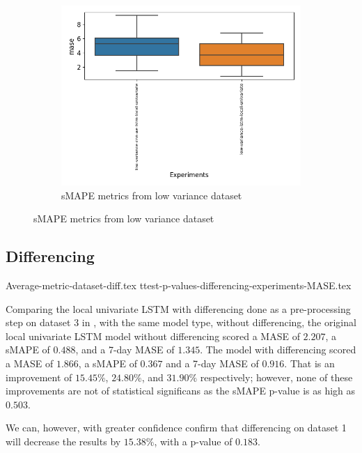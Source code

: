 \begin{figure}[h!]
\begin{subfigure}[b]{0.49\textwidth}
  \end{subfigure}
  \begin{subfigure}[b]{0.49\textwidth}
    \includegraphics[width=\textwidth]{./figs/results/boxplot/mase-dataset_low_variance.png}
    \hfill
    \caption{sMAPE metrics from low variance dataset}

  \end{subfigure}
\end{figure}

\subsection{Differencing}
{Average-metric-dataset-diff.tex}
{ttest-p-values-differencing-experiments-MASE.tex}






Comparing the local univariate LSTM with differencing done as a pre-processing step
on dataset 3 in ,
with the same model type, without differencing,
the original local univariate LSTM model without differencing scored a MASE of
$2.207$, a sMAPE of $0.488$, and a 7-day MASE of $1.345$.
The model with differencing scored a MASE of $1.866$, a sMAPE of $0.367$ and a 7-day MASE of
$0.916$. That is an improvement of $15.45\%$, $24.80\%$, and $31.90\%$ respectively; however, none of these improvements are not of statistical significans as the sMAPE p-value is as high as $0.503$.

We can, however, with greater confidence confirm that differencing on dataset 1 will decrease
the results by $15.38\%$, with a p-value of $0.183$.